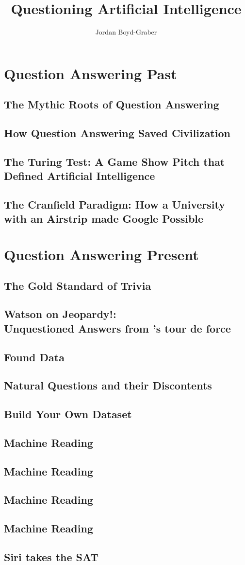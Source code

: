 \documentclass[bfivepaper,twosided,justified,nobib]{tufte-book}
\title{Questioning Artificial Intelligence}
\author{Jordan Boyd-Graber}
\newif\ifproposal\proposalfalse
\newcommand{\proposalpart}[1]{
  \ifproposal
  \subsection{#1}
  \else
  \part{#1}
  \fi
}
\newcommand{\chapterfile}[3]{
  \ifproposal
  \paragraph{#3}
  
  \else
  \chapter{#3}
  \label{ch:#1}
  
  \fi}
\begin{document}
\setcounter{secnumdepth}{0}









\ifproposal

\fi


\ifproposal

\else

\tableofcontents



\clearpage


\proposalpart{Question Answering Past}


\chapterfile{110}{epic}{The Mythic Roots of Question Answering}

\chapterfile{120}{civilization}{How Question Answering Saved Civilization}





\chapterfile{130}{turing}{The Turing Test: A Game Show Pitch that
  Defined Artificial Intelligence}

\chapterfile{140}{ir}{The Cranfield Paradigm: How a University with an Airstrip made Google Possible}

\proposalpart{Question Answering Present}



\chapterfile{240}{qb}{The Gold Standard of Trivia}
\fi

\chapterfile{250}{watson}{Watson on Jeopardy!: \\ Unquestioned Answers from \abr{ibm}'s tour de force}

  \ifproposal

  \else
  
\chapterfile{260}{datasets_found}{Found  Data}
\chapterfile{261}{datasets_natural}{Natural Questions and their Discontents}
\chapterfile{262}{datasets_constructed}{Build Your Own Dataset}

\chapterfile{270}{methods_kb}{Machine Reading}
\chapterfile{271}{methods_mr}{Machine Reading}
\chapterfile{272}{methods_deep_retrieval}{Machine Reading}
\chapterfile{273}{methods_generation}{Machine Reading}

\chapterfile{280}{leaderboards}{Siri takes the SAT}
\end{document}

